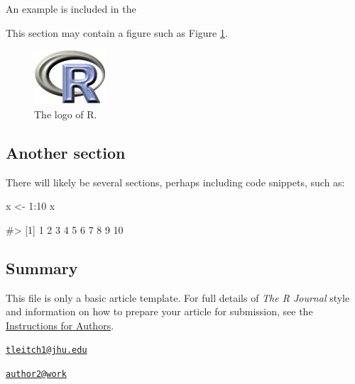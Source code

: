 An example is included in the

This section may contain a figure such as Figure \ref{figure:rlogo}.

\begin{figure}[htbp]
  \centering
  \includegraphics{Rlogo}
  \caption{The logo of R.}
  \label{figure:rlogo}
\end{figure}

\subsection{Another section}\label{another-section}

There will likely be several sections, perhaps including code snippets,
such as:

\begin{Schunk}
\begin{Sinput}
x <- 1:10
x
\end{Sinput}
\begin{Soutput}
#>  [1]  1  2  3  4  5  6  7  8  9 10
\end{Soutput}
\end{Schunk}

\subsection{Summary}\label{summary}

This file is only a basic article template. For full details of
\emph{The R Journal} style and information on how to prepare your
article for submission, see the
\href{https://journal.r-project.org/share/author-guide.pdf}{Instructions
for Authors}. 

\address{%
Terry Leitch\\
Ruxton Advisors\\
line 1\\ line 2\\
}
\href{mailto:tleitch1@jhu.edu}{\nolinkurl{tleitch1@jhu.edu}}

\address{%
Author Two\\
Affiliation\\
line 1\\ line 2\\
}
\href{mailto:author2@work}{\nolinkurl{author2@work}}

